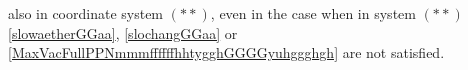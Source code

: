 \documentclass{article}
\theoremstyle{definition}
\theoremstyle{remark}
\newcommand{\er}{\eqref}
\newcommand{\er}{\eqref}
\begin{document}
also in coordinate system $(**)$, even in the case when in system
$(**)$ \er{slowaetherGGaa}, \er{slochangGGaa} or
\er{MaxVacFullPPNmmmffffffhhtygghGGGGyuhggghgh} are not satisfied.
\end{document}
